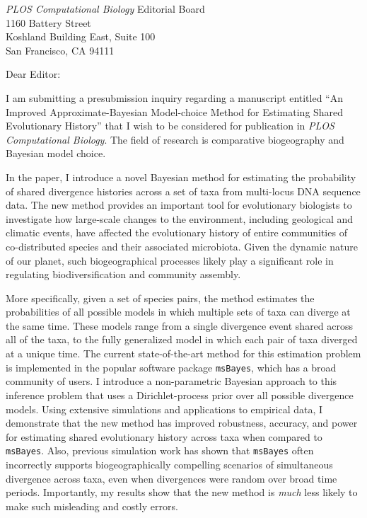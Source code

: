 \documentclass[letterpaper,11pt]{letter}
\newcommand{\highLight}[1]{\textcolor{magenta}{\MakeUppercase{#1}}\xspace}
\begin{document}
\begin{letter}{\emph{PLOS Computational Biology} Editorial Board \\
                        1160 Battery Street \\
                        Koshland Building East, Suite 100 \\
                    San Francisco, CA 94111}
\opening{Dear Editor:}
I am submitting a presubmission inquiry regarding a manuscript entitled ``An
Improved Approximate-Bayesian Model-choice Method for Estimating Shared
Evolutionary History'' that I wish to be considered for publication in
\emph{PLOS Computational Biology}.
The field of research is comparative biogeography and Bayesian model choice.

In the paper, I introduce a novel Bayesian method for estimating the
probability of shared divergence histories across a set of taxa from
multi-locus DNA sequence data.
The new method provides an important tool for evolutionary biologists to
investigate how large-scale changes to the environment, including geological
and climatic events, have affected the evolutionary history of entire
communities of co-distributed species and their associated microbiota.
Given the dynamic nature of our planet, such biogeographical processes likely
play a significant role in regulating biodiversification and community assembly.

More specifically, given a set of species pairs, the method estimates
the probabilities of all possible models in which multiple sets of taxa
can diverge at the same time.
These models range from a single divergence event shared across all of the
taxa, to the fully generalized model in which each pair of taxa diverged at a
unique time.
The current state-of-the-art method for this estimation problem is implemented
in the popular software package \texttt{msBayes}, which has a broad community
of users.
I introduce a non-parametric Bayesian approach to this inference problem that
uses a Dirichlet-process prior over all possible divergence models.
Using extensive simulations and applications to empirical data, I demonstrate
that the new method has improved robustness, accuracy, and power for estimating
shared evolutionary history across taxa when compared to \texttt{msBayes}.
Also, previous simulation work has shown that \texttt{msBayes} often
incorrectly supports biogeographically compelling scenarios of simultaneous
divergence across taxa, even when divergences were random over broad time
periods.
Importantly, my results show that the new method is \emph{much} less likely to
make such misleading and costly errors.


\end{letter}
\end{document}
